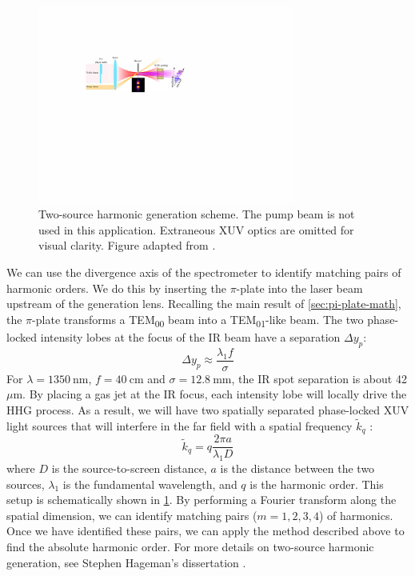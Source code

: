 \begin{figure}
	\centering
	\includegraphics[width=0.75\textwidth]{figures/chap2/two_source_HHG.pdf}
	\caption{Two-source harmonic generation scheme. The pump beam is not used in this application. Extraneous XUV optics are omitted for visual clarity. Figure adapted from \cite{camperTransverseElectromagneticMode2015}.}
	\label{fig:two-source-cartoon}
\end{figure}

We can use the divergence axis of the spectrometer to identify matching pairs of harmonic orders. We do this by inserting the $\pi$-plate into the laser beam upstream of the generation lens. Recalling the main result of \cref{sec:pi-plate-math}, the $\pi$-plate transforms a TEM\textsubscript{00} beam into a TEM\textsubscript{01}-like beam. The two phase-locked intensity lobes at the focus of the IR beam have a separation $\Delta y_p$:
$$
\Delta y_p \approx \frac{\lambda_1 f}{\sigma}
$$
For $\lambda = 1350 \ \textrm{nm}$, $f=40 \ \textrm{cm}$ and $\sigma = 12.8 \ \textrm{mm}$, the IR spot separation is about 42 $\mu$m. By placing a gas jet at the IR focus, each intensity lobe will locally drive the HHG process. As a result, we will have two spatially separated phase-locked XUV light sources that will interfere in the far field with a spatial frequency $\tilde{k}_q$  \cite{camperTransverseElectromagneticMode2015}:
\begin{equation}
\tilde{k}_q = q \frac{2 \pi a}{\lambda_1 D}
\end{equation}
where $D$ is the source-to-screen distance, $a$ is the distance between the two sources, $\lambda_1$ is the fundamental wavelength, and $q$ is the harmonic order. This setup is schematically shown in \cref{fig:two-source-cartoon}. By performing a Fourier transform along the spatial dimension, we can identify matching pairs ($m=1,2,3,4$) of harmonics. Once we have identified these pairs, we can apply the method described above to find the absolute harmonic order. For more details on two-source harmonic generation, see Stephen Hageman's dissertation \cite{hagemanComplexAttosecondTransientAbsorption2020}.

